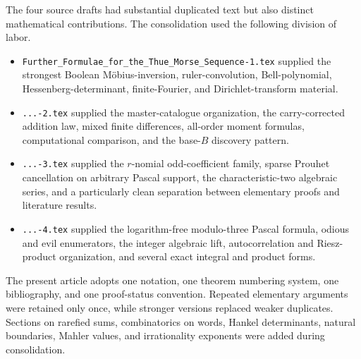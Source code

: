 \documentclass[11pt,oneside]{article}
\theoremstyle{definition}
\theoremstyle{remark}
\begin{document}
The four source drafts had substantial duplicated text but also distinct mathematical
contributions.  The consolidation used the following division of labor.

\begin{itemize}
\item \texttt{Further\_Formulae\_for\_the\_Thue\_Morse\_Sequence-1.tex} supplied the strongest
      Boolean M\"obius-inversion, ruler-convolution, Bell-polynomial, Hessenberg-determinant,
      finite-Fourier, and Dirichlet-transform material.
\item \texttt{...-2.tex} supplied the master-catalogue organization, the carry-corrected
      addition law, mixed finite differences, all-order moment formulas, computational
      comparison, and the base-\(B\) discovery pattern.
\item \texttt{...-3.tex} supplied the \(r\)-nomial odd-coefficient family, sparse Prouhet
      cancellation on arbitrary Pascal support, the characteristic-two algebraic series,
      and a particularly clean separation between elementary proofs and literature results.
\item \texttt{...-4.tex} supplied the logarithm-free modulo-three Pascal formula, odious and
      evil enumerators, the integer algebraic lift, autocorrelation and Riesz-product
      organization, and several exact integral and product forms.
\end{itemize}
The present article adopts one notation, one theorem numbering system, one bibliography, and
one proof-status convention.  Repeated elementary arguments were retained only once, while
stronger versions replaced weaker duplicates.  Sections on rarefied sums, combinatorics on
words, Hankel determinants, natural boundaries, Mahler values, and irrationality exponents
were added during consolidation.
\end{document}
